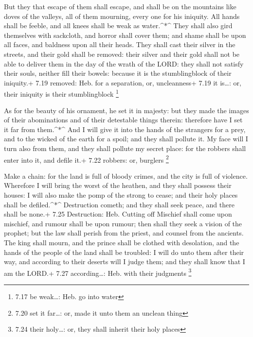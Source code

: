  But they that escape of them shall escape, and shall be on
the mountains like doves of the valleys, all of them mourning, every one
for his iniquity.  All hands shall be feeble, and all knees
shall be weak as water.\^{}*\^{}  They shall also gird
themselves with sackcloth, and horror shall cover them; and shame shall
be upon all faces, and baldness upon all their heads.  They
shall cast their silver in the streets, and their gold shall be removed:
their silver and their gold shall not be able to deliver them in the day
of the wrath of the LORD: they shall not satisfy their souls, neither
fill their bowels: because it is the stumblingblock of their iniquity.+
7.19 removed: Heb. for a separation, or, uncleanness+ 7.19 it is\ldots:
or, their iniquity is their stumblingblock \footnote{7.17 be weak\ldots:
  Heb. go into water}

 As for the beauty of his ornament, he set it in majesty:
but they made the images of their abominations and of their detestable
things therein: therefore have I set it far from them.\^{}*\^{}
 And I will give it into the hands of the strangers for a
prey, and to the wicked of the earth for a spoil; and they shall pollute
it.  My face will I turn also from them, and they shall
pollute my secret place: for the robbers shall enter into it, and defile
it.+ 7.22 robbers: or, burglers \footnote{7.20 set it far\ldots: or,
  made it unto them an unclean thing}

 Make a chain: for the land is full of bloody crimes, and
the city is full of violence.  Wherefore I will bring the
worst of the heathen, and they shall possess their houses: I will also
make the pomp of the strong to cease; and their holy places shall be
defiled.\^{}*\^{}  Destruction cometh; and they shall seek
peace, and there shall be none.+ 7.25 Destruction: Heb. Cutting off
 Mischief shall come upon mischief, and rumour shall be
upon rumour; then shall they seek a vision of the prophet; but the law
shall perish from the priest, and counsel from the ancients.
 The king shall mourn, and the prince shall be clothed with
desolation, and the hands of the people of the land shall be troubled: I
will do unto them after their way, and according to their deserts will I
judge them; and they shall know that I am the LORD.+ 7.27
according\ldots: Heb. with their judgments \footnote{7.24 their
  holy\ldots: or, they shall inherit their holy places}


